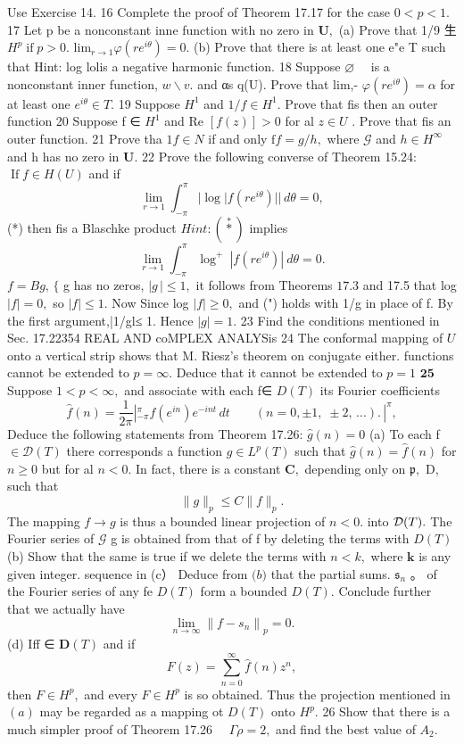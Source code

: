 Use Exercise 14. 16 Complete the proof of Theorem 17.17 for the case $0<p<1.$ 17 Let p be a nonconstant inne function with no zero in ${\boldsymbol{U}},$ (a) Prove that 1/9 生 $H^{p}\operatorname{if}p>0.$ ${\mathrm{lim}}_{r\to1}\varphi(r e^{i\theta})=0.$ (b) Prove that there is at least one e"e T such that Hint: log lolis a negative harmonic function. 18 Suppose $\textstyle\varnothing\quad$ is a nonconstant inner function, $\scriptstyle w\backslash v.$ and αs q(U). Prove that lim,- $\varphi(r e^{i\theta})=\alpha$ for at least one $e^{i\theta}\in T.$ 19 Suppose ${\textstyle H^{1}}$ and $1/f\in H^{1}.$ Prove that fis then an outer function 20 Suppose f ∈ $H^{1}$ and Re $[f(z)]>0$ for al $z\in U$ . Prove that fis an outer function. 21 Prove tha $1f\in N$ if and only $\mathrm{f}f=g/h,$ where $\scriptstyle{\mathcal{G}}$ and $h\in H^{\infty}$ and h has no zero in ${\boldsymbol{U}}.$ 22 Prove the following converse of Theorem 15.24: $\operatorname{If}f\in H(U)$ and if $$ \operatorname*{lim}_{r\to1}\int_{-\pi}^{\pi}|\log|f(r e^{i\theta})||\,d\theta=0, $$ (*) then fis a Blaschke product $H i n t:({\overset{*}{*}})$ implies $$ \operatorname*{lim}_{r\to1}\int_{-\pi}^{\pi}\log^{+}\ |f(r e^{i\theta})|\ d\theta=0. $$ $f=B g,\,\lbrace$ g has no zeros, $|g\,|\leq1,$ it follows from Theorems $17.3$ and 17.5 that log $|f|=0,$ so $|f|\leq1.$ Now Since log $|f|\geq0,$ and (") holds with 1/g in place of f. By the first argument,|1/gl≤ 1. Hence $|g|=1.$ 23 Find the conditions mentioned in Sec. 17.22354 REAL AND coMPLEX ANALYSis 24 The conformal mapping of $\boldsymbol{\mathit{U}}$ onto a vertical strip shows that M. Riesz's theorem on conjugate either. functions cannot be extended to $p=\infty.$ Deduce that it cannot be extended to $p=1$ $\mathbf{25}$ Suppose $1<p<\infty,$ and associate with each f∈ $D(T)$ its Fourier coefficients $$ \hat{f}(n)=\frac{1}{2\pi}\left|_{-\pi}^{\pi}f(e^{i n})e^{-i n t}\,d t\qquad(n=0,\pm1,\;\pm2,\,...).\nonumber\,\right|^{\pi}, $$ Deduce the following statements from Theorem 17.26: ${\hat{g}}(n)=0$ (a) To each f $\in{\mathcal{D}}(T)$ there corresponds a function $g\in L^{p}(T)$ such that ${\hat{g}}(n)={\hat{f}}(n)$ for $n\geq0$ but for al $n<0.$ In fact, there is a constant ${\boldsymbol{C}},$ depending only on ${\mathfrak{p}},$ D, such that $$ \|g\|_{p}\leq C\|f\|_{p}. $$ The mapping $f\to g$ is thus a bounded linear projection of $n<0.$ into ${\cal D}(T).$ The Fourier series of $\scriptstyle{\mathcal{G}}$ g is obtained from that of f by deleting the terms with $D(T)$ (b) Show that the same is true if we delete the terms with $n<k,$ where $\boldsymbol{k}$ is any given integer. sequence in (c） Deduce from ${\mathfrak{(}}b{\mathfrak{)}}$ that the partial sums. ${\mathfrak{s}}_{n}$ 。 of the Fourier series of any fe $D(T)$ form a bounded $D(T).$ Conclude further that we actually have $$ \operatorname*{lim}_{n\to\infty}\left\|f-s_{n}\right\|_{p}=0. $$ (d) Iff ∈ ${\boldsymbol{D}}(T)$ and if $$ F(z)=\sum_{n=0}^{\infty}\hat{f}(n)z^{n}, $$ then $F\in H^{p},$ and every $F\in H^{p}$ is so obtained. Thus the projection mentioned in ${\mathbf{}}(a)$ may be regarded as a mapping ot $D(T)$ onto $H^{p}.$ 26 Show that there is a much simpler proof of Theorem 17.26 $\quad\Gamma\rho=2,$ and find the best value of $A_{2}.$ 